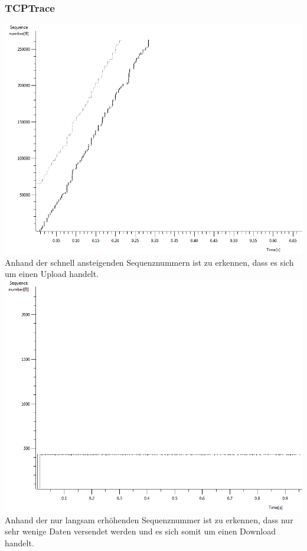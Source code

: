 \subsubsection{TCPTrace}
\includegraphics[scale=0.5]{media/tcptraceUpload.png}\\
Anhand der schnell ansteigenden Sequenznummern ist zu erkennen, dass es sich um einen Upload handelt.\\
\includegraphics[scale=0.5]{media/tcptraceDownload.png}\\
Anhand der nur langsam erhöhenden Sequenznummer ist zu erkennen, dass nur sehr wenige Daten versendet werden und es sich somit um einen Download handelt.
